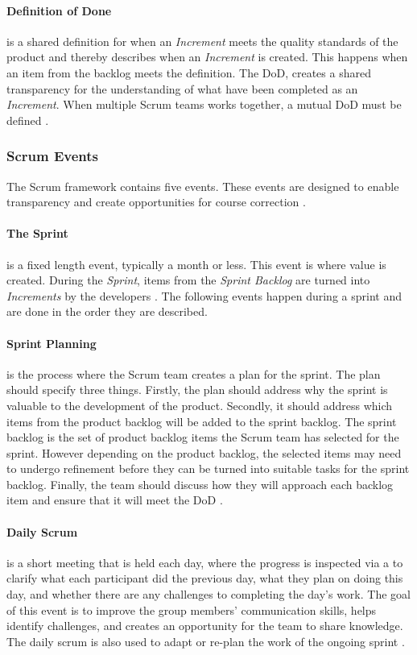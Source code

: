 \paragraph{Definition of Done} \label{par:definition-of-done}
is a shared definition for when an \emph{Increment} meets the quality standards of the product and thereby describes when an \emph{Increment} is created.
This happens when an item from the backlog meets the definition.
The DoD, creates a shared transparency for the understanding of what have been completed as an \emph{Increment}.
When multiple Scrum teams works together, a mutual DoD must be defined \cite{schwaber_sutherland_2022}.
\subsubsection{Scrum Events}
The Scrum framework contains five events. 
These events are designed to enable transparency and create opportunities for course correction \cite{schwaber_sutherland_2022}.

\paragraph{The Sprint}
is a fixed length event, typically a month or less.
This event is where value is created. 
During the \emph{Sprint}, items from the \emph{Sprint Backlog} are turned into \emph{Increments} by the developers \cite{schwaber_sutherland_2022}.
The following events happen during a sprint and are done in the order they are described. 

\paragraph{Sprint Planning}
is the process where the Scrum team creates a plan for the sprint.
The plan should specify three things. 
Firstly, the plan should address why the sprint is valuable to the development of the product. 
Secondly, it should address which items from the product backlog will be added to the sprint backlog. 
The sprint backlog is the set of product backlog items the Scrum team has selected for the sprint. 
However depending on the product backlog, the selected items may need to undergo refinement before they can be turned into suitable tasks for the sprint backlog. 
Finally, the team should discuss how they will approach each backlog item and ensure that it will meet the DoD \cite{schwaber_sutherland_2022}.

\paragraph{Daily Scrum}
is a short meeting that is held each day, where the progress is inspected via a  to clarify what each participant did the previous day, what they plan on doing this day, and whether there are any challenges to completing the day's work.
The goal of this event is to improve the group members' communication skills, helps identify challenges, and creates an opportunity for the team to share knowledge.
The daily scrum is also used to adapt or re-plan the work of the ongoing sprint \cite{schwaber_sutherland_2022}.

